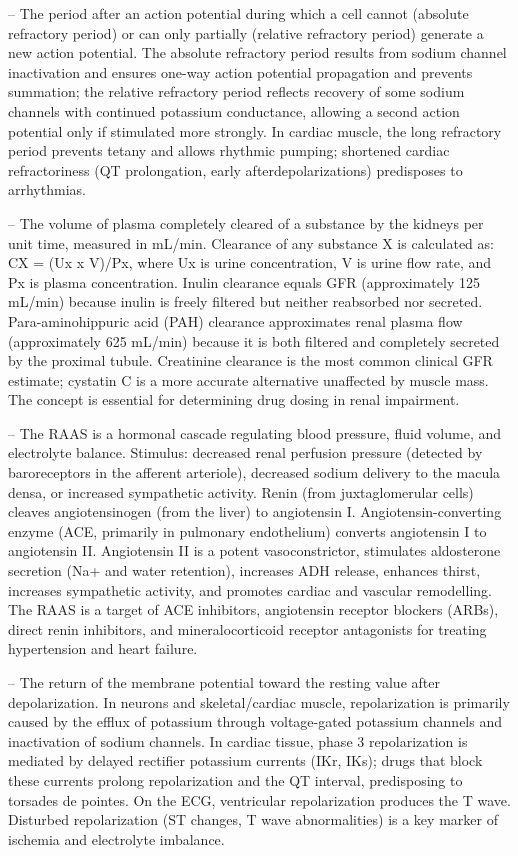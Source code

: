 -- The period after an action potential during which a cell cannot (absolute refractory period) or can only partially (relative refractory period) generate a new action potential. The absolute refractory period results from sodium channel inactivation and ensures one-way action potential propagation and prevents summation; the relative refractory period reflects recovery of some sodium channels with continued potassium conductance, allowing a second action potential only if stimulated more strongly. In cardiac muscle, the long refractory period prevents tetany and allows rhythmic pumping; shortened cardiac refractoriness (QT prolongation, early afterdepolarizations) predisposes to arrhythmias.

-- The volume of plasma completely cleared of a substance by the kidneys per unit time, measured in mL/min. Clearance of any substance X is calculated as: CX = (Ux x V)/Px, where Ux is urine concentration, V is urine flow rate, and Px is plasma concentration. Inulin clearance equals GFR (approximately 125 mL/min) because inulin is freely filtered but neither reabsorbed nor secreted. Para-aminohippuric acid (PAH) clearance approximates renal plasma flow (approximately 625 mL/min) because it is both filtered and completely secreted by the proximal tubule. Creatinine clearance is the most common clinical GFR estimate; cystatin C is a more accurate alternative unaffected by muscle mass. The concept is essential for determining drug dosing in renal impairment.

-- The RAAS is a hormonal cascade regulating blood pressure, fluid volume, and electrolyte balance. Stimulus: decreased renal perfusion pressure (detected by baroreceptors in the afferent arteriole), decreased sodium delivery to the macula densa, or increased sympathetic activity. Renin (from juxtaglomerular cells) cleaves angiotensinogen (from the liver) to angiotensin I. Angiotensin-converting enzyme (ACE, primarily in pulmonary endothelium) converts angiotensin I to angiotensin II. Angiotensin II is a potent vasoconstrictor, stimulates aldosterone secretion (Na+ and water retention), increases ADH release, enhances thirst, increases sympathetic activity, and promotes cardiac and vascular remodelling. The RAAS is a target of ACE inhibitors, angiotensin receptor blockers (ARBs), direct renin inhibitors, and mineralocorticoid receptor antagonists for treating hypertension and heart failure.

-- The return of the membrane potential toward the resting value after depolarization. In neurons and skeletal/cardiac muscle, repolarization is primarily caused by the efflux of potassium through voltage-gated potassium channels and inactivation of sodium channels. In cardiac tissue, phase 3 repolarization is mediated by delayed rectifier potassium currents (IKr, IKs); drugs that block these currents prolong repolarization and the QT interval, predisposing to torsades de pointes. On the ECG, ventricular repolarization produces the T wave. Disturbed repolarization (ST changes, T wave abnormalities) is a key marker of ischemia and electrolyte imbalance.

